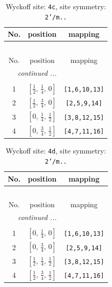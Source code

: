 \documentclass[fleqn,8pt]{jsarticle}
\begin{document}
\renewcommand{\arraystretch}{1.2}
\begin{longtable}{ccc}
\caption{Wyckoff site: {\tt 4c}, site symmetry: {\tt 2'/m..}}
 \\
 \hline \hline
No. & position & mapping \\ \hline \endfirsthead

\multicolumn{2}{l}{\tablename\ \thetable{}} \\
 \hline \hline
No. & position & mapping \\ \hline \endhead

 \hline \hline
\multicolumn{2}{r}{\footnotesize\it continued ...} \\ \endfoot

 \hline \hline
\multicolumn{2}{r}{} \\ \endlastfoot

1 & $\left[ \frac{1}{2},\, \frac{1}{4},\, 0 \right]$ & {\tt [1,6,10,13]} \\ \hline
2 & $\left[ \frac{1}{2},\, \frac{3}{4},\, 0 \right]$ & {\tt [2,5,9,14]} \\ \hline
3 & $\left[ 0,\, \frac{1}{4},\, \frac{1}{2} \right]$ & {\tt [3,8,12,15]} \\ \hline
4 & $\left[ 0,\, \frac{3}{4},\, \frac{1}{2} \right]$ & {\tt [4,7,11,16]} \\
\end{longtable}
\renewcommand{\arraystretch}{1.2}
\begin{longtable}{ccc}
\caption{Wyckoff site: {\tt 4d}, site symmetry: {\tt 2'/m..}}
 \\
 \hline \hline
No. & position & mapping \\ \hline \endfirsthead

\multicolumn{2}{l}{\tablename\ \thetable{}} \\
 \hline \hline
No. & position & mapping \\ \hline \endhead

 \hline \hline
\multicolumn{2}{r}{\footnotesize\it continued ...} \\ \endfoot

 \hline \hline
\multicolumn{2}{r}{} \\ \endlastfoot

1 & $\left[ 0,\, \frac{1}{4},\, 0 \right]$ & {\tt [1,6,10,13]} \\ \hline
2 & $\left[ 0,\, \frac{3}{4},\, 0 \right]$ & {\tt [2,5,9,14]} \\ \hline
3 & $\left[ \frac{1}{2},\, \frac{1}{4},\, \frac{1}{2} \right]$ & {\tt [3,8,12,15]} \\ \hline
4 & $\left[ \frac{1}{2},\, \frac{3}{4},\, \frac{1}{2} \right]$ & {\tt [4,7,11,16]} \\
\end{longtable}
\end{document}
